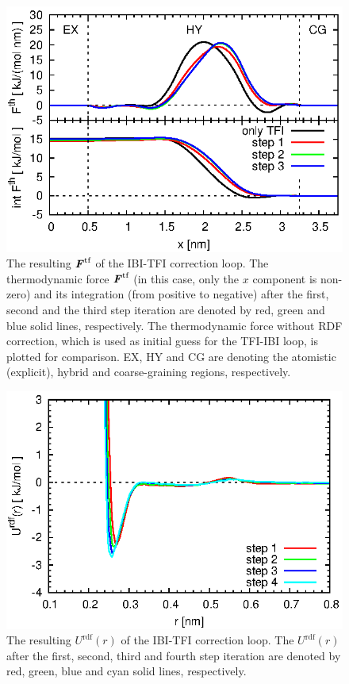 \documentclass[aps,pre,preprint,unsortedaddress]{revtex4}
\renewcommand{\v}[1]{\textbf{\textit{#1}}}
\begin{document}
\begin{figure}
  \centering
  \includegraphics{fig/tf-and-int.eps}
  \caption{The resulting $\v F^{\textrm{tf}}$ of the IBI-TFI
    correction loop.  The thermodynamic force $\v F^{\textrm{tf}}$ (in
    this case, only the $x$ component is non-zero) and its integration
    (from positive to negative) after the first, second and the third
    step iteration are denoted by red, green and blue solid lines,
    respectively.  The thermodynamic force without RDF correction,
    which is used as initial guess for the TFI-IBI loop, is plotted
    for comparison. EX, HY and CG are denoting the atomistic
    (explicit), hybrid and coarse-graining regions, respectively.}
  \label{fig:tmp5}
\end{figure}

\begin{figure}
  \centering
  \includegraphics{fig/force-rdf.eps}
  \caption{The resulting $U^{\textrm{rdf}}(r)$ of the IBI-TFI
    correction loop.  The $U^{\textrm{rdf}}(r)$ after the first,
    second, third and fourth step iteration are denoted by red, green,
    blue and cyan solid lines, respectively.  }
  \label{fig:tmp6}
\end{figure}
\end{document}
